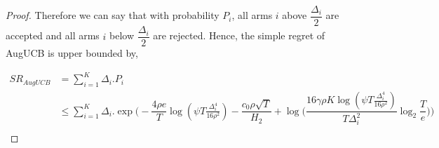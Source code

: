 \begin{proof}
Therefore we can say that with probability $P_{i}$, all arms $i$ above $\dfrac{\Delta_{i}}{2}$ are accepted and all arms $i$ below $\dfrac{\Delta_{i}}{2}$ are rejected. Hence, the simple regret of AugUCB is upper bounded by,

\begin{align*}
SR_{AugUCB} &= \sum_{i=1}^{K} \Delta_{i}. P_{i}\\
& \leq \sum_{i=1}^{K} \Delta_{i}. \exp\bigg(-\dfrac{4\rho e}{T}\log (\psi T\frac{\Delta_{i}^{4}}{16\rho^{2}})-\dfrac{c_{0}\rho\sqrt{T}}{H_{2}} + \log \big( \dfrac{16\gamma\rho K\log (\psi T \frac{\Delta_{i}^{4}}{16\rho^{2}})}{T\Delta_{i}^{2}}\log_{2}\dfrac{T}{e} \big) \bigg) \\
\end{align*}

%
%
%
%
%
%
%
%
%
%

\end{proof}

